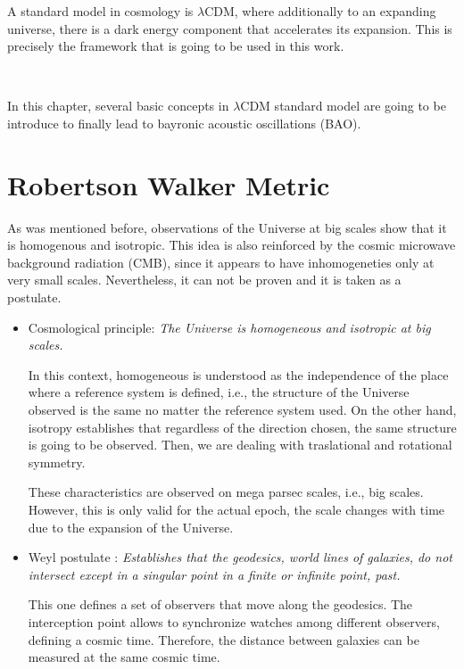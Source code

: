 A standard model in cosmology is $\lambda$CDM, where additionally to an 
expanding universe, there is a dark energy component that accelerates 
its expansion. This is precisely the framework that is going to 
be used in this work. 

\

In this chapter, several basic concepts in $\lambda$CDM standard model are going to 
be introduce to finally lead to bayronic acoustic oscillations (BAO). 

\section{ Robertson Walker Metric}

As was mentioned before, observations of the Universe at big scales show 
that it is homogenous and isotropic. This idea is also reinforced by the cosmic 
microwave background radiation (CMB), since it appears to have inhomogeneties
only at very small scales. Nevertheless, it can not be proven and it is taken
as a postulate. 

\begin{itemize}
\item Cosmological principle: \emph{ The Universe is homogeneous and isotropic 
at big scales.}

In this context, homogeneous is understood as the independence of the place 
where a reference system is defined, i.e., the structure of the Universe observed 
is the same no matter the reference system used. 
On the other hand, isotropy establishes that regardless of the direction chosen, 
the same structure is going to be observed. Then, we are dealing with traslational
and rotational symmetry. 

These characteristics are observed on mega parsec scales, i.e., big scales. 
However, this is only valid for the actual epoch, the scale changes with time due 
to the expansion of the Universe. 


\item Weyl postulate :\emph{ Establishes that the geodesics, world lines of 
galaxies, do not intersect except in a singular point in a finite or infinite 
point, past.} 

This one defines a set of observers that move along the geodesics. 
The interception point allows to synchronize watches among different observers,
defining a cosmic time. Therefore, the distance between galaxies can
be measured at the same cosmic time. 

\end{itemize} 

